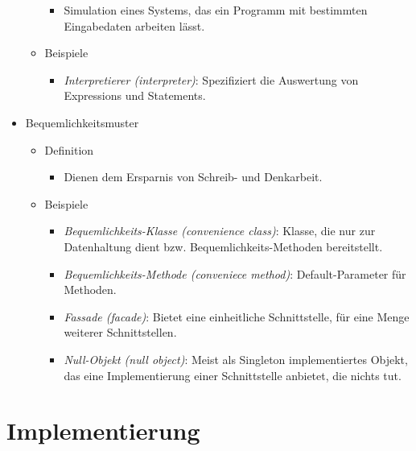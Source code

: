 \documentclass{article}
\begin{document}
\begin{itemize}
\begin{itemize}
    \begin{itemize}
      \item Simulation eines Systems, das ein Programm mit bestimmten Eingabedaten arbeiten lässt. 
    \end{itemize}
    \item Beispiele
    \begin{itemize}
      \item \textit{Interpretierer (interpreter)}: Spezifiziert die Auswertung von Expressions und Statements.
    \end{itemize}
  \end{itemize}
  \item Bequemlichkeitsmuster
  \begin{itemize}
    \item Definition
    \begin{itemize}
      \item Dienen dem Ersparnis von Schreib- und Denkarbeit.
    \end{itemize}
    \item Beispiele
    \begin{itemize}
      \item \textit{Bequemlichkeits-Klasse (convenience class)}: Klasse, die nur zur Datenhaltung dient bzw. Bequemlichkeits-Methoden bereitstellt.
      \item \textit{Bequemlichkeits-Methode (conveniece method)}: Default-Parameter für Methoden.
      \item \textit{Fassade (facade)}: Bietet eine einheitliche Schnittstelle, für eine Menge weiterer Schnittstellen.
      \item \textit{Null-Objekt (null object)}: Meist als Singleton implementiertes Objekt, das eine Implementierung einer Schnittstelle anbietet, die nichts tut.
    \end{itemize}
  \end{itemize}
\end{itemize}

\section{Implementierung}
\end{document}
